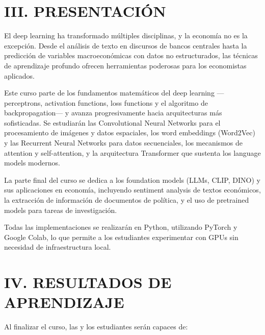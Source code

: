 \documentclass[11pt,a4paper]{article}
\begin{document}
\section*{III. PRESENTACI\'ON}

El deep learning ha transformado m\'ultiples disciplinas, y la econom\'ia no es la excepci\'on. Desde el an\'alisis de texto en discursos de bancos centrales hasta la predicci\'on de variables macroecon\'omicas con datos no estructurados, las t\'ecnicas de aprendizaje profundo ofrecen herramientas poderosas para los economistas aplicados.

Este curso parte de los fundamentos matem\'aticos del deep learning ---perceptrons, activation functions, loss functions y el algoritmo de backpropagation--- y avanza progresivamente hacia arquitecturas m\'as sofisticadas. Se estudiar\'an las Convolutional Neural Networks para el procesamiento de im\'agenes y datos espaciales, los word embeddings (Word2Vec) y las Recurrent Neural Networks para datos secuenciales, los mecanismos de attention y self-attention, y la arquitectura Transformer que sustenta los language models modernos.

La parte final del curso se dedica a los foundation models (LLMs, CLIP, DINO) y sus aplicaciones en econom\'ia, incluyendo sentiment analysis de textos econ\'omicos, la extracci\'on de informaci\'on de documentos de pol\'itica, y el uso de pretrained models para tareas de investigaci\'on.

Todas las implementaciones se realizar\'an en Python, utilizando PyTorch y Google Colab, lo que permite a los estudiantes experimentar con GPUs sin necesidad de infraestructura local.

\section*{IV. RESULTADOS DE APRENDIZAJE}

Al finalizar el curso, las y los estudiantes ser\'an capaces de:
\end{document}
